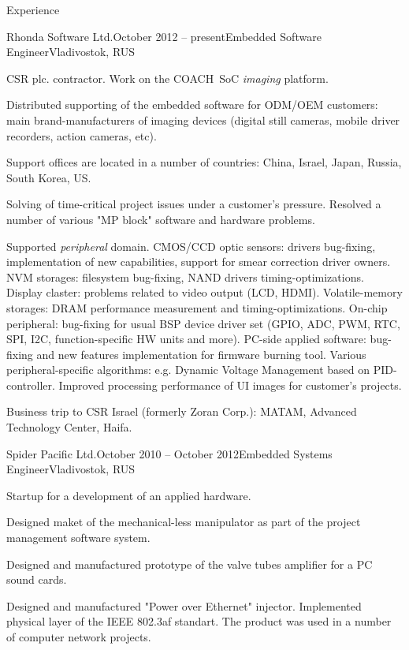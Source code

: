 \documentclass{template}
\begin{document}
\begin{rSection}{Experience}

\begin{rCompany}{Rhonda Software Ltd.}{October 2012 -- present}{Embedded Software Engineer}{Vladivostok, RUS}
\item CSR plc. contractor. Work on the COACH\texttrademark \ SoC \textit{imaging} platform.
\item Distributed supporting of the embedded software for ODM/OEM customers: main brand-manufacturers of imaging devices (digital still cameras, mobile driver recorders, action cameras, etc).
\item Support offices are located in a number of countries: China, Israel, Japan, Russia, South Korea, US.
\item Solving of time-critical project issues under a customer's pressure. Resolved a number of various "MP block" software and hardware problems.
\item Supported \textit{peripheral} domain. CMOS/CCD optic sensors: drivers bug-fixing, implementation of new capabilities, support for smear correction driver owners. NVM storages: filesystem bug-fixing, NAND drivers timing-optimizations. Display claster: problems related to video output (LCD, HDMI). Volatile-memory storages: DRAM performance measurement and timing-optimizations. On-chip peripheral: bug-fixing for usual BSP device driver set (GPIO, ADC, PWM, RTC, SPI, I2C, function-specific HW units and more). PC-side applied software: bug-fixing and new features implementation for firmware burning tool. Various peripheral-specific algorithms: e.g. Dynamic Voltage Management based on PID-controller. Improved processing performance of UI images for customer's projects.
\item Business trip to CSR Israel (formerly Zoran Corp.): MATAM, Advanced Technology Center, Haifa.
\end{rCompany}

\begin{rCompany}{Spider Pacific Ltd.}{October 2010 -- October 2012}{Embedded Systems Engineer}{Vladivostok, RUS}
\item Startup for a development of an applied hardware.
\item Designed maket of the mechanical-less manipulator as part of the project management software system.
\item Designed and manufactured prototype of the valve tubes amplifier for a PC sound cards.
\item Designed and manufactured "Power over Ethernet" injector. Implemented physical layer of the IEEE 802.3af standart. The product was used in a number of computer network projects.
\end{rCompany}

\end{rSection}
\end{document}
